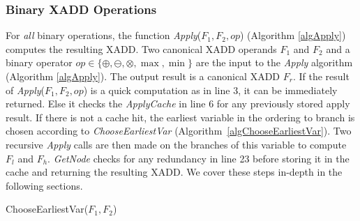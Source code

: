 \documentclass[twoside,11pt]{article}
\begin{document}
\subsubsection{Binary XADD Operations}

For \emph{all} binary operations, the function \emph{Apply}($F_1,F_2,\mathit{op}$) (Algorithm \ref{algApply}) computes the resulting XADD. 
Two canonical XADD operands $F_1$ and $F_2$ and a binary operator $\mathit{op} \in \{ \oplus, \ominus, \otimes , \max , \min \} $ are the input to the \emph{Apply} algorithm (Algorithm \ref{algApply}). The output result is a canonical XADD $F_r$. 
If the result of \emph{Apply}($F_1,F_2,\mathit{op}$) is a quick computation as in line 3, 
it can be immediately returned. Else it checks the \emph{ApplyCache} in line 6 for any previously stored apply result.  If there is not a cache hit, the earliest variable in the ordering to branch is chosen according to \emph{ChooseEarliestVar}
(Algorithm~\ref{algChooseEarliestVar}). Two recursive \emph{Apply} calls are then made on the branches of this variable to compute $F_l$ and $F_h$. \emph{GetNode} checks for any redundancy in line 23 before storing it in the cache and returning the resulting XADD. We cover these steps in-depth in the following sections.

\begin{algorithm}[t!]

\caption{{\sc ChooseEarliestVar}($F_1,F_2$)  \label{algChooseVarBranch}}
\end{algorithm}
\end{document}
